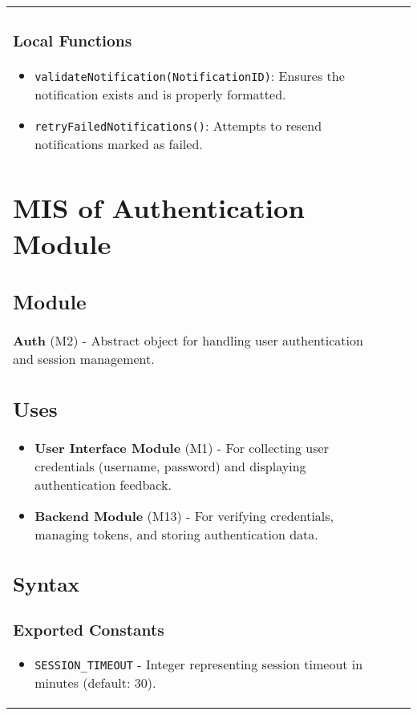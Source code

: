 \documentclass[12pt, titlepage]{article}
\begin{document}
\begin{itemize}
\begin{center}
\begin{tabular}{|p{3cm}|p{4cm}|p{4cm}|p{4cm}|}
\begin{itemize}
\subsubsection{Local Functions}

\begin{itemize}
    \item \texttt{validateNotification(NotificationID)}: Ensures the notification exists and is properly formatted.
    \item \texttt{retryFailedNotifications()}: Attempts to resend notifications marked as failed.
\end{itemize}

\newpage

\section{MIS of Authentication Module} \label{Auth}

\subsection{Module}

\textbf{Auth} (M2) - Abstract object for handling user authentication and session management.

\subsection{Uses}

\begin{itemize}
	\item \textbf{User Interface Module} (M1) - For collecting user credentials (username, password)
	and displaying authentication feedback.
	\item \textbf{Backend Module} (M13) - For verifying credentials, managing tokens, and storing
	authentication data.
\end{itemize}


\subsection{Syntax}

\subsubsection{Exported Constants}
\begin{itemize}
	\item \texttt{SESSION\_TIMEOUT} - Integer representing session timeout in minutes (default: 30).
\end{itemize}


\end{itemize}
\end{tabular}
\end{center}
\end{itemize}
\end{document}
